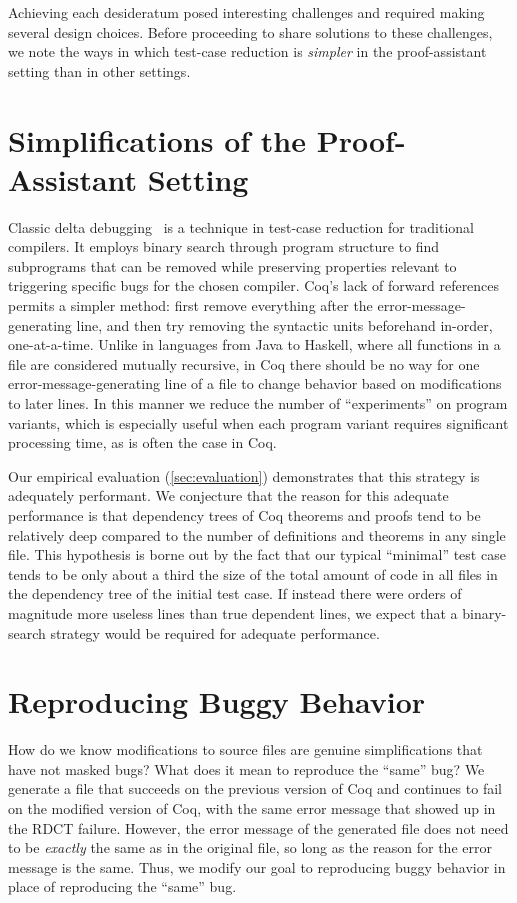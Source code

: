 \documentclass[a4paper,USenglish,cleveref,autoref,thm-restate,pdfa]{lipics-v2021}
\begin{document}
Achieving each desideratum posed interesting challenges and required making several design choices.
Before proceeding to share solutions to these challenges, we note the ways in which test-case reduction is \emph{simpler} in the proof-assistant setting than in other settings.


\section{Simplifications of the Proof-Assistant Setting}\label{sec:easier}

Classic delta debugging~\cite{Zeller2002} is a technique in test-case reduction for traditional compilers.
It employs binary search through program structure to find subprograms that can be removed while preserving properties relevant to triggering specific bugs for the chosen compiler.
Coq's lack of forward references permits a simpler method: first remove everything after the error-message-generating line, and then try removing the syntactic units beforehand in-order, one-at-a-time.
Unlike in languages from Java to Haskell, where all functions in a file are considered mutually recursive, in Coq there should be no way for one error-message-generating line of a file to change behavior based on modifications to later lines.
In this manner we reduce the number of ``experiments'' on program variants, which is especially useful when each program variant requires significant processing time, as is often the case in Coq.

Our empirical evaluation (\autoref{sec:evaluation}) demonstrates that this strategy is adequately performant.
We conjecture that the reason for this adequate performance is that dependency trees of Coq theorems and proofs tend to be relatively deep compared to the number of definitions and theorems in any single file.
This hypothesis is borne out by the fact that our typical ``minimal'' test case tends to be only about a third the size of the total amount of code in all files in the dependency tree of the initial test case.
If instead there were orders of magnitude more useless lines than true dependent lines, we expect that a binary-search strategy would be required for adequate performance.

\section{Reproducing Buggy Behavior}\label{sec:error-messages}

How do we know modifications to source files are genuine simplifications that have not masked bugs?
What does it mean to reproduce the ``same'' bug?
We generate a file that succeeds on the previous version of Coq and continues to fail on the modified version of Coq, with the same error message that showed up in the RDCT failure.
However, the error message of the generated file does not need to be \emph{exactly} the same as in the original file, so long as the reason for the error message is the same.
Thus, we modify our goal to reproducing buggy behavior in place of reproducing the ``same'' bug.
\end{document}
